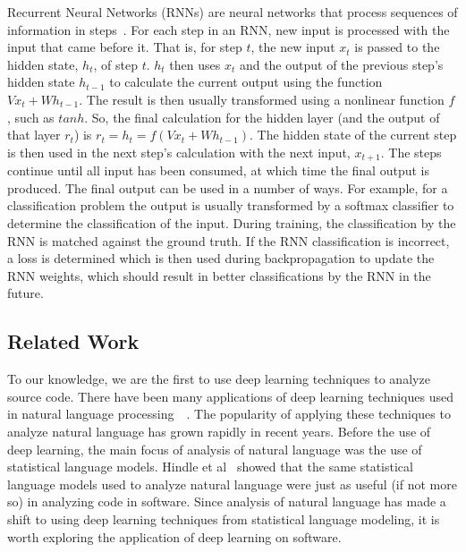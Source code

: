 Recurrent Neural Networks (RNNs) are neural networks that process sequences of information in steps~\cite{elman1990finding}. For each step in an RNN, new input is processed with the input that came before it. That is, for step $t$, the new input $x_t$ is passed to the hidden state, $h_t$, of step $t$. $h_t$ then uses $x_t$ and the output of the previous step's hidden state $h_{t-1}$ to calculate the current output using the function $Vx_t + Wh_{t-1}$. The result is then usually transformed using a nonlinear function $f$, such as $tanh$. So, the final calculation for the hidden layer (and the output of that layer $r_t$) is $r_t = h_t = f(Vx_t + Wh_{t-1})$. The hidden state of the current step is then used in the next step's calculation with the next input, $x_{t+1}$. The steps continue until all input has been consumed, at which time the final output is produced. The final output can be used in a number of ways. For example, for a classification problem the output is usually transformed by a softmax classifier to determine the classification of the input. During training, the classification by the RNN is matched against the ground truth. If the RNN classification is incorrect, a loss is determined which is then used during backpropagation to update the RNN weights, which should result in better classifications by the RNN in the future.

\subsection{Related Work}

To our knowledge, we are the first to use deep learning techniques to analyze source code. There have been many applications of deep learning techniques used in natural language processing~\cite{collobert2008unified}~\cite{glorot2011domain}. The popularity of applying these techniques to analyze natural language has grown rapidly in recent years. Before the use of deep learning, the main focus of analysis of natural language was the use of statistical language models. Hindle et al~\cite{hindle2012naturalness} showed that the same statistical language models used to analyze natural language were just as useful (if not more so) in analyzing code in software. Since analysis of natural language has made a shift to using deep learning techniques from statistical language modeling, it is worth exploring the application of deep learning on software.

